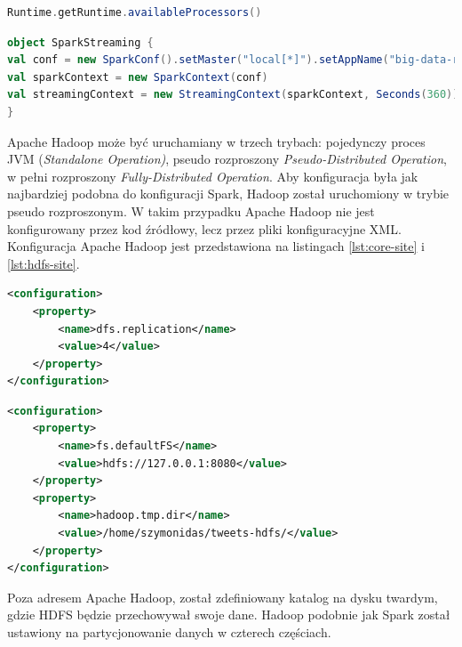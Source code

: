 \begin{lstlisting}[language=scala, caption={Metoda zwracająca liczbę dostępnych wątków wirtualnej maszyny Java},captionpos=b, label={lst:jvm-threads-access}]
Runtime.getRuntime.availableProcessors() 
\end{lstlisting}
\begin{lstlisting}[language=scala, caption={Konfigracja klastra dla Apache Spark},captionpos=b, label={lst:spark-cluster-config}]
object SparkStreaming {
val conf = new SparkConf().setMaster("local[*]").setAppName("big-data-runner-spark-driver-application")
val sparkContext = new SparkContext(conf)
val streamingContext = new StreamingContext(sparkContext, Seconds(360))
}
\end{lstlisting} 
Apache Hadoop może być uruchamiany w trzech trybach: pojedynczy proces JVM (\textit{Standalone Operation)}, pseudo rozproszony \textit{Pseudo-Distributed Operation}, w pełni rozproszony \textit{Fully-Distributed Operation}. Aby konfiguracja była jak najbardziej podobna do konfiguracji Spark, Hadoop został uruchomiony w trybie pseudo rozproszonym. W takim przypadku Apache Hadoop nie jest konfigurowany przez kod źródłowy, lecz przez pliki konfiguracyjne XML. Konfiguracja Apache Hadoop jest przedstawiona na listingach \ref{lst:core-site} i \ref{lst:hdfs-site}.
\begin{lstlisting}[language=XML, label={lst:hdfs-site},captionpos=b, caption={Konfigracja Apache Hadoop dla trybu pseudo rozproszonego. Plik hdfs-site.xml}]
<configuration>
	<property>
		<name>dfs.replication</name>
		<value>4</value>
	</property>
</configuration>
\end{lstlisting}
\begin{lstlisting}[language=XML, label={lst:core-site}, captionpos=b, caption={Konfigracja Apache Hadoop dla trybu pseudo rozproszonego. Plik core-site.xml}, float]
<configuration>
	<property>
		<name>fs.defaultFS</name>
		<value>hdfs://127.0.0.1:8080</value>
	</property>
	<property>
		<name>hadoop.tmp.dir</name>
		<value>/home/szymonidas/tweets-hdfs/</value>
	</property>
</configuration>
\end{lstlisting}
Poza adresem Apache Hadoop, został zdefiniowany katalog na dysku twardym, gdzie HDFS będzie przechowywał swoje dane. Hadoop podobnie jak Spark został ustawiony na partycjonowanie danych w czterech częściach.
